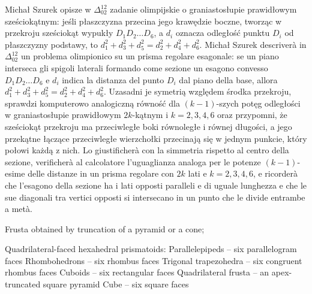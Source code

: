 Michał Szurek opisze w $\Delta_{02}^{12}$ zadanie olimpijskie o graniastosłupie prawidłowym sześciokątnym: jeśli płaszczyzna przecina jego krawędzie boczne, tworząc w przekroju sześciokąt wypukły $D_1 D_2 \ldots D_6$, a $d_i$ oznacza odległość punktu $D_i$ od płaszczyzny podstawy, to $d_1^2 + d_3^2 + d_5^2 = d_2^2 + d_4^2 + d_6^2$. %
Michał Szurek descriverà in $\Delta_{02}^{12}$ un problema olimpionico su un prisma regolare esagonale: se un piano interseca gli spigoli laterali formando come sezione un esagono convesso $D_1 D_2 \ldots D_6$ e $d_i$ indica la distanza del punto $D_i$ dal piano della base, allora $d_1^2 + d_3^2 + d_5^2 = d_2^2 + d_4^2 + d_6^2$. %
Uzasadni je symetrią względem środka przekroju, sprawdzi komputerowo analogiczną równość dla $(k-1)$-szych potęg odległości w graniastosłupie prawidłowym $2k$-kątnym i $k = 2, 3, 4, 6$ oraz przypomni, że sześciokąt przekroju ma przeciwległe boki równoległe i równej długości, a jego przekątne łączące przeciwległe wierzchołki przecinają się w jednym punkcie, który połowi każdą z nich. %
Lo giustificherà con la simmetria rispetto al centro della sezione, verificherà al calcolatore l'uguaglianza analoga per le potenze $(k-1)$-esime delle distanze in un prisma regolare con $2k$ lati e $k = 2, 3, 4, 6$, e ricorderà che l'esagono della sezione ha i lati opposti paralleli e di uguale lunghezza e che le sue diagonali tra vertici opposti si intersecano in un punto che le divide entrambe a metà. %

\begin{example}
[antygraniastosłup] %
[antiprisma] %
\end{example}

\begin{example}
[kopuła] %
[cupola] %
\end{example}

\begin{example}[frustum]
    Frusta obtained by truncation of a pyramid or a cone;
\end{example}

\begin{example}
[równoległościan] %
[paralleloedro] %
    Quadrilateral-faced hexahedral prismatoids:
        Parallelepipeds – six parallelogram faces
        Rhombohedrons – six rhombus faces
        Trigonal trapezohedra – six congruent rhombus faces
        Cuboids – six rectangular faces
        Quadrilateral frusta – an apex-truncated square pyramid
        Cube – six square faces
\end{example}

